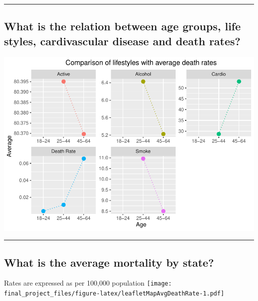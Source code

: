 \documentclass[]{article}
\begin{document}
\begin{center}\rule{0.5\linewidth}{\linethickness}\end{center}

\hypertarget{what-is-the-relation-between-age-groups-life-styles-cardivascular-disease-and-death-rates}{%
\subsection{What is the relation between age groups, life styles,
cardivascular disease and death
rates?}\label{what-is-the-relation-between-age-groups-life-styles-cardivascular-disease-and-death-rates}}

\includegraphics{final_project_files/figure-latex/lifestyleJoinDeathRate-1.pdf}

\begin{center}\rule{0.5\linewidth}{\linethickness}\end{center}

\hypertarget{what-is-the-average-mortality-by-state}{%
\subsection{What is the average mortality by
state?}\label{what-is-the-average-mortality-by-state}}

Rates are expressed as per 100,000 population
\texttt{[image: final\_project\_files/figure-latex/leafletMapAvgDeathRate-1.pdf]}
\end{document}
